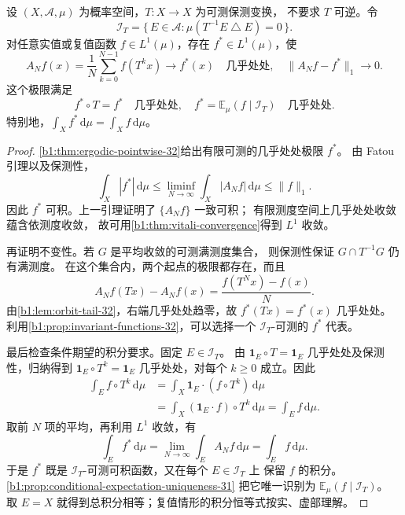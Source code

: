 \begin{theorem}
\label{b1:thm:birkhoff-32}
设 \((X,\mathcal A,\mu)\) 为概率空间，\(T:X\to X\) 为可测保测变换，
不要求 \(T\) 可逆。令
\[
 \mathcal I_T=\{\,E\in\mathcal A:\mu(T^{-1}E\mathbin{\triangle}E)=0\,\}.
\]
对任意实值或复值函数 \(f\in L^1(\mu)\)，存在 \(f^*\in L^1(\mu)\)，使
\begin{equation}
 A_Nf(x)=\frac1N\sum_{k=0}^{N-1}f(T^kx)\longrightarrow f^*(x)
 \quad\text{几乎处处},\quad
 \|A_Nf-f^*\|_1\longrightarrow0.
 \label{b1:eq:birkhoff-limit-32}
\end{equation}
这个极限满足
\begin{equation}
 f^*\circ T=f^*\quad\text{几乎处处},\quad
 f^*=\mathbb E_\mu(f\mid\mathcal I_T)\quad\text{几乎处处}.
 \label{b1:eq:birkhoff-conditional-32}
\end{equation}
特别地，\(\int_Xf^*\,\mathrm d\mu=\int_Xf\,\mathrm d\mu\)。
\end{theorem}
\begin{proof}
\cref{b1:thm:ergodic-pointwise-32}给出有限可测的几乎处处极限 \(f^*\)。
由 Fatou 引理以及保测性，
\[
 \int_X|f^*|\,\mathrm d\mu
 \leq\liminf_{N\to\infty}\int_X|A_Nf|\,\mathrm d\mu
 \leq\|f\|_1.
\]
因此 \(f^*\) 可积。上一引理证明了 \(\{A_Nf\}\) 一致可积；
有限测度空间上几乎处处收敛蕴含依测度收敛，
故可用\cref{b1:thm:vitali-convergence}得到 \(L^1\) 收敛。

再证明不变性。若 \(G\) 是平均收敛的可测满测度集合，
则保测性保证 \(G\cap T^{-1}G\) 仍有满测度。
在这个集合内，两个起点的极限都存在，而且
\[
 A_Nf(Tx)-A_Nf(x)=\frac{f(T^Nx)-f(x)}N.
\]
由\cref{b1:lem:orbit-tail-32}，右端几乎处处趋零，故
\(f^*(Tx)=f^*(x)\) 几乎处处。
利用\cref{b1:prop:invariant-functions-32}，可以选择一个
\(\mathcal I_T\)-可测的 \(f^*\) 代表。

最后检查条件期望的积分要求。固定 \(E\in\mathcal I_T\)。
由 \(\mathbf1_E\circ T=\mathbf1_E\) 几乎处处及保测性，归纳得到
\(\mathbf1_E\circ T^k=\mathbf1_E\) 几乎处处，对每个 \(k\geq0\) 成立。因此
\[
 \begin{aligned}
 \int_E f\circ T^k\,\mathrm d\mu
 &=\int_X\mathbf1_E\cdot(f\circ T^k)\,\mathrm d\mu\\
 &=\int_X(\mathbf1_E\cdot f)\circ T^k\,\mathrm d\mu
 =\int_E f\,\mathrm d\mu.
 \end{aligned}
\]
取前 \(N\) 项的平均，再利用 \(L^1\) 收敛，有
\[
 \int_Ef^*\,\mathrm d\mu
 =\lim_{N\to\infty}\int_EA_Nf\,\mathrm d\mu
 =\int_Ef\,\mathrm d\mu.
\]
于是 \(f^*\) 既是 \(\mathcal I_T\)-可测可积函数，又在每个 \(E\in\mathcal I_T\) 上
保留 \(f\) 的积分。\cref{b1:prop:conditional-expectation-uniqueness-31}%
把它唯一识别为 \(\mathbb E_\mu(f\mid\mathcal I_T)\)。
取 \(E=X\) 就得到总积分相等；复值情形的积分恒等式按实、虚部理解。
\end{proof}

